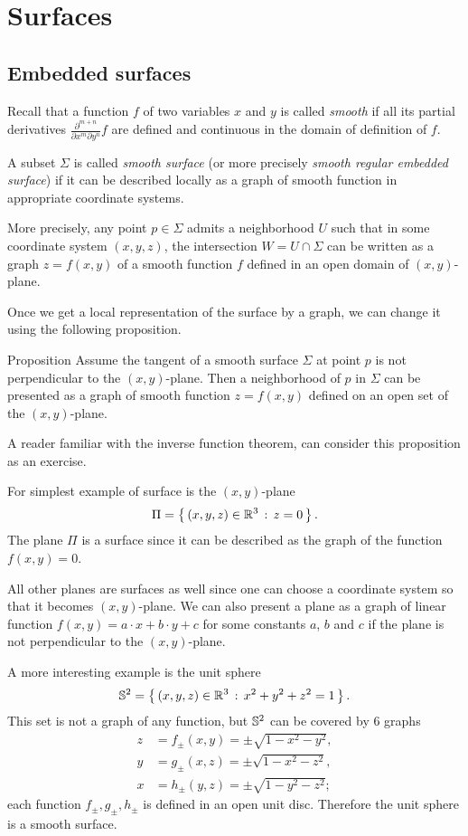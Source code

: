 \chapter{Surfaces}

\section{Embedded surfaces}

Recall that a function $f$ of two variables $x$ and $y$ is called \emph{smooth} if all its partial derivatives $\frac{\partial^{m+n}}{\partial x^m\partial y^n}f$ are defined and continuous in the domain of definition of $f$. 

A subset $\Sigma$ is called \emph{smooth surface} (or more precisely \emph{smooth regular embedded surface}) if it can be described locally as a graph of smooth function in appropriate coordinate systems.

More precisely, any point $p\in \Sigma$ admits a neighborhood $U$ such that
in some coordinate system $(x,y,z)$, 
the intersection $W=U\cap \Sigma$ can be written as a graph $z=f(x,y)$ of a smooth function $f$ defined in an open domain of $(x,y)$-plane.

Once we get a local representation of the surface by a graph, we can change it using the following proposition.

\begin{thm}{Proposition}\label{prop:perp}
Assume the tangent of a smooth surface $\Sigma$ at point $p$ is not perpendicular to the $(x,y)$-plane.
Then a neighborhood of $p$ in $\Sigma$ can be presented as a graph of smooth function $z=f(x,y)$ defined on an open set of the $(x,y)$-plane.
\end{thm}

A reader familiar with the inverse function theorem, can consider this proposition as an exercise.


For simplest example of surface is the $(x,y)$-plane 
\[\Pi=\left\{\,{(x,y,z)\in\mathbb{R}^3}\,:\,{z=0}\,\right\}.\]
The plane $\Pi$ is a surface since
it can be described as the graph of the function $f(x,y)=0$.

All other planes are surfaces as well since one can choose a coordinate system so that it becomes $(x,y)$-plane.
We can also present a plane as a graph of linear function 
$f(x,y)=a\cdot x+b\cdot y+c$ for some constants $a$, $b$ and $c$
if the plane is not perpendicular to the $(x,y)$-plane.

A more interesting example is the unit sphere 
\[\mathbb{S}^2=\left\{\,{(x,y,z)\in\mathbb{R}^3}\,:\,{x^2+y^2+z^2=1}\,\right\}.\]
This set is not a graph of any function,
but $\mathbb{S}^2$
can be covered by 6 graphs 
\begin{align*}
z&=f_\pm(x,y)=\pm \sqrt{1-x^2-y^2},
\\
y&=g_\pm(x,z)=\pm \sqrt{1-x^2-z^2},
\\
x&=h_\pm(y,z)=\pm \sqrt{1-y^2-z^2};
\end{align*}
each function $f_\pm,g_\pm,h_\pm$ is defined in an open unit disc.
Therefore the unit sphere is a smooth surface.

